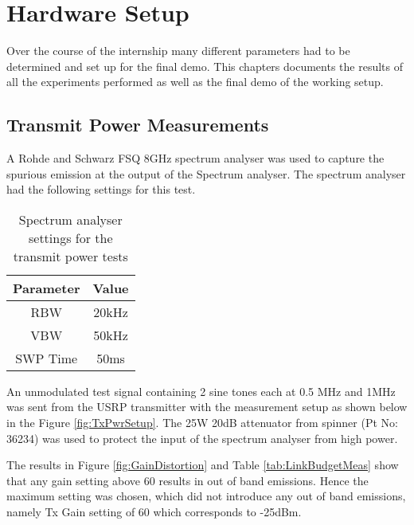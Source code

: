 \chapter{Hardware Setup}
\label{ch:HWSetup}

Over the course of the internship many different parameters had to be determined and set up for the final demo. This chapters documents the results of all the experiments performed as well as the final demo of the working setup.

\section{Transmit Power Measurements}\label{GainDistortion}

A Rohde and Schwarz FSQ 8GHz spectrum analyser was used to capture the spurious emission at the output of the Spectrum analyser. The spectrum analyser had the following settings for this test.

\begin{table}[H]
    \begin{center}
        \begin{tabular}{|c|c|}
            \hline
            Parameter & Value \\ \hline
            RBW & 20kHz \\ \hline
            VBW & 50kHz \\ \hline
            SWP Time & 50ms  \\ 
            \hline
        \end{tabular}
    \end{center}
    \caption{Spectrum analyser settings for the transmit power tests}
    \label{}
\end{table}

An unmodulated test signal containing 2 sine tones each at 0.5 MHz and 1MHz was sent from the USRP transmitter with the measurement setup as shown below in the Figure \ref{fig:TxPwrSetup}. The 25W 20dB attenuator from spinner (Pt No: 36234) was used to protect the input of the spectrum analyser from high power.


The results in Figure \ref{fig:GainDistortion} and Table \ref{tab:LinkBudgetMeas} show that any gain setting above 60 results in out of band emissions. Hence the maximum setting was chosen, which did not introduce any out of band emissions, namely Tx Gain setting of 60 which corresponds to -25dBm.

